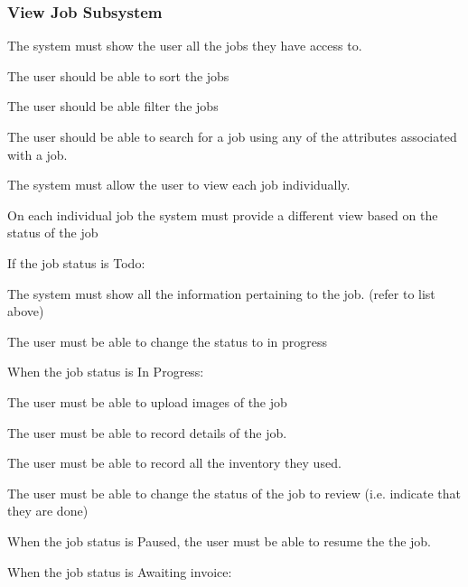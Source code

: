 \documentclass{article}
\begin{document}
	\subsubsection*{View Job Subsystem}	
	\begin{list}{R.}{}
		\item The system must show the user all the jobs they have access to.
		\begin{list}{R.}{}
			\item The user should be able to sort the jobs
			\item The user should be able filter the jobs 
			\item The user should be able to search for a job using any of the attributes associated with a job. 
		\end{list}
		\item The system must allow the user to view each job individually.
		\item On each individual job the system must provide a different view based on the status of the job
		\item If the job status is Todo:
		\begin{list}{R.}{}
			\item The system must show all the information pertaining to the job. (refer to list above)
			\item The user must be able to change the status to in progress
		\end{list}
		\item When the job status is In Progress:
		\begin{list}{R.}{}
			\item The user must be able to upload images of the job
			\item The user must be able to record details of the job.
			\item The user must be able to record all the inventory they used. 
			\item The user must be able to change the status of the job to review (i.e. indicate that they are done)
		\end{list}
		\item When the job status is Paused, the user must be able to resume the the job.
		\item When the job status is Awaiting invoice:

\end{list}
\end{document}
